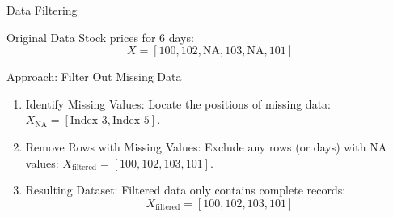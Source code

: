 \documentclass{beamer}
\begin{document}
\begin{frame}{Data Filtering}
   \begin{block}{Original Data}
       Stock prices for 6 days:
       \[
       X = [100, 102, \text{NA}, 103, \text{NA}, 101]
       \]
   \end{block}

   \begin{block}{Approach: Filter Out Missing Data}
       \begin{enumerate}
           \item Identify Missing Values:
           Locate the positions of missing data:
           $X_{\text{NA}} = [\text{Index 3}, \text{Index 5}]$.

           \item Remove Rows with Missing Values:
           Exclude any rows (or days) with $\text{NA}$ values:
           $X_{\text{filtered}} = [100, 102, 103, 101]$.

           \item Resulting Dataset:
           Filtered data only contains complete records:
           \[
           X_{\text{filtered}} = [100, 102, 103, 101]
           \]
       \end{enumerate}
   \end{block}

\end{frame}
\end{document}
